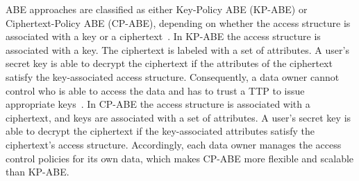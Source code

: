 ABE approaches are classified as either Key-Policy ABE (KP-ABE) or Ciphertext-Policy ABE (CP-ABE), depending on whether the access structure is associated with a key or a ciphertext~\cite{Goyal2006,Bethencourt2007,Hu2023}.
In KP-ABE the access structure is associated with a key.
The ciphertext is labeled with a set of attributes.
A user's secret key is able to decrypt the ciphertext if the attributes of the ciphertext satisfy the key-associated access structure.
Consequently, a data owner cannot control who is able to access the data and has to trust a TTP to issue appropriate keys~\cite{Bethencourt2007}.
In CP-ABE the access structure is associated with a ciphertext, and keys are associated with a set of attributes.
A user's secret key is able to decrypt the ciphertext if the key-associated attributes satisfy the ciphertext's access structure.
Accordingly, each data owner manages the access control policies for its own data, which makes CP-ABE more flexible and scalable than KP-ABE.
